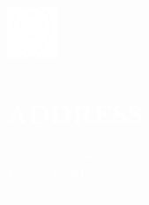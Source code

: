 \documentclass[../main.tex]{subfiles}
\begin{document}
    \hspace*{0.2cm}
    \begin{minipage}[t]{2cm}
        \vspace*{0.75cm}\includegraphics[width=1.5cm]{assets/location.png}
    \end{minipage}
    \begin{minipage}[t]{5cm}

        \vspace*{0.5cm}
        \section*{\textcolor{white}{ADDRESS}}
        \vspace*{-0.25cm}
        \textcolor{white}{
            C/Jaume Balmes\\
            Mataró, 08301 \\
            Barcelona, Spain
        }
    \end{minipage}
\end{document}
